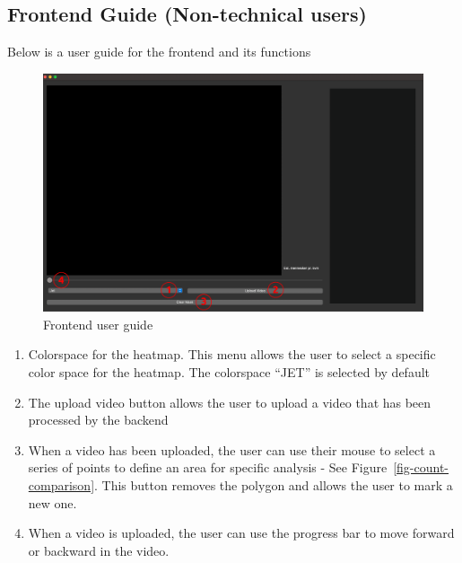 \documentclass[
]{article}
\begin{document}
\hypertarget{frontend-guide-non-technical-users}{%
\subsection*{Frontend Guide (Non-technical
users)}\label{frontend-guide-non-technical-users}}

Below is a user guide for the frontend and its functions\\

\begin{figure}

{\centering \includegraphics{../appendices/Frontend.png}

}

\caption{\label{fig-frontend}Frontend user guide}

\end{figure}

\begin{enumerate}
\def\labelenumi{\arabic{enumi}.}
\item
  Colorspace for the heatmap. This menu allows the user to select a
  specific color space for the heatmap. The colorspace ``JET'' is
  selected by default
\item
  The upload video button allows the user to upload a video that has
  been processed by the backend
\item
  When a video has been uploaded, the user can use their mouse to select
  a series of points to define an area for specific analysis - See
  Figure~\ref{fig-count-comparison}. This button removes the polygon and
  allows the user to mark a new one.
\item
  When a video is uploaded, the user can use the progress bar to move
  forward or backward in the video.
\end{enumerate}
\end{document}
